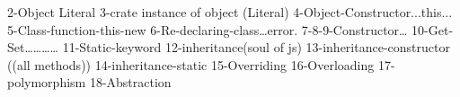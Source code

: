 2-Object Literal
3-crate instance of object (Literal)
4-Object-Constructor...this...
5-Class-function-this-new
6-Re-declaring-class…error.
7-8-9-Constructor…
10-Get-Set…………
11-Static-keyword
12-inheritance(soul of js)
13-inheritance-constructor ((all methods))
14-inheritance-static
15-Overriding
16-Overloading
17-polymorphism
18-Abstraction